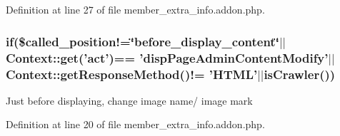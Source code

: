 Definition at line 27 of file member\+\_\+extra\+\_\+info.\+addon.\+php.

\hypertarget{member__extra__info_8addon_8php_a29031816e50a8f742422e671b2bef9b2}{
\subsubsection[{if}]{\setlength{\rightskip}{0pt plus 5cm}if(\$called\+\_\+position!=\char`\"{}before\+\_\+display\+\_\+content\char`\"{}$\vert$$\vert$Context\+::get('act')== 'disp\+Page\+Admin\+Content\+Modify'$\vert$$\vert${\bf Context\+::get\+Response\+Method}()!= 'H\+T\+M\+L'$\vert$$\vert${\bf is\+Crawler}())}}\label{member__extra__info_8addon_8php_a29031816e50a8f742422e671b2bef9b2}
Just before displaying, change image name/ image mark 

Definition at line 20 of file member\+\_\+extra\+\_\+info.\+addon.\+php.

